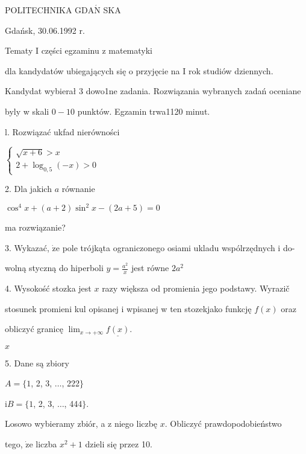 \documentclass[a4paper,12pt]{article}
\begin{document}
POLITECHNIKA $\mathrm{G}\mathrm{D}\mathrm{A}\acute{\mathrm{N}}$ SKA

Gdańsk, 30.06.1992 r.

Tematy I części egzaminu z matematyki

dla kandydatów ubiegających się o przyjęcie na I rok studiów dziennych.

Kandydat wybierał 3 dowo1ne zadania. Rozwiązania wybranych zadań oceniane

byly w skali $0-10$ punktów. Egzamin trwa1120 minut.

l. Rozwiązać ukfad nierówności

$\left\{\begin{array}{l}
\sqrt{x+6}>x\\
2+\log_{0,5}(-x)>0
\end{array}\right.$

2. Dla jakich $a$ równanie

$\cos^{4}x+(a+2)\sin^{2}x-(2a+5)=0$

ma rozwiązanie?

3. Wykazać, $\dot{\mathrm{z}}\mathrm{e}$ pole trójkąta ograniczonego osiami ukladu wspólrzędnych i do-

wolną styczną do hiperboli $y=\displaystyle \frac{a^{2}}{x}$ jest równe $2a^{2}$

4. Wysokość stozka jest $x$ razy większa od promienia jego podstawy. Wyrazič

stosunek promieni kul opisanej i wpisanej w ten stozekjako funkcję $f(x)$ oraz

obliczyć granicę $\displaystyle \lim_{x\rightarrow+\infty} \underline{f(x)}.$

$x$

5. Dane są zbiory

$A=\{1$, 2, 3, $\ldots$, 222$\}$

$\mathrm{i} B=\{1$, 2, 3, $\ldots$, 444$\}.$

Losowo wybieramy zbiór, a z niego liczbę $x$. Obliczyć prawdopodobieństwo

tego, $\dot{\mathrm{z}}\mathrm{e}$ liczba $x^{2}+1$ dzieli się przez 10.
\end{document}
